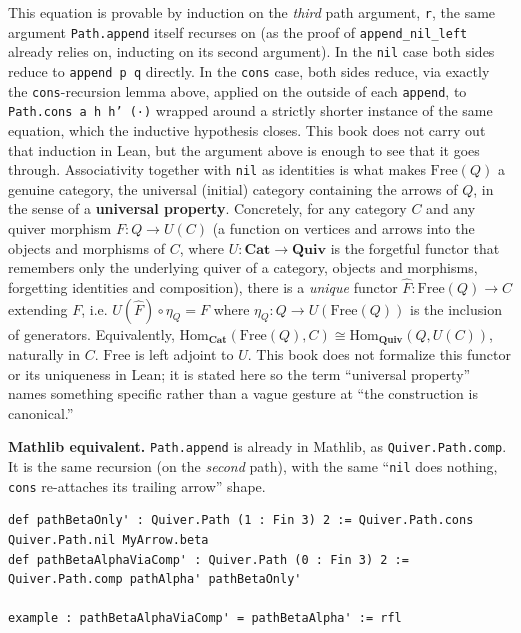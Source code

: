 This equation is provable by induction on the \emph{third} path argument, \texttt{r}, the same argument \texttt{Path.append} itself recurses on (as the proof of \texttt{append\_\allowbreak{}nil\_\allowbreak{}left} already relies on, inducting on its second argument). In the \texttt{nil} case both sides reduce to \texttt{append p q} directly. In the \texttt{cons} case, both sides reduce, via exactly the \texttt{cons}-recursion lemma above, applied on the outside of each \texttt{append}, to \texttt{Path.cons a h h' (·)} wrapped around a strictly shorter instance of the same equation, which the inductive hypothesis closes. This book does not carry out that induction in Lean, but the argument above is enough to see that it goes through. Associativity together with \texttt{nil} as identities is what makes \(\mathrm{Free}(Q)\) a genuine category, the universal (initial) category containing the arrows of \(Q\), in the sense of a \textbf{universal property}. Concretely, for any category \(C\) and any quiver morphism \(F : Q \to U(C)\) (a function on vertices and arrows into the objects and morphisms of \(C\), where \(U : \mathbf{Cat} \to \mathbf{Quiv}\) is the forgetful functor that remembers only the underlying quiver of a category, objects and morphisms, forgetting identities and composition), there is a \emph{unique} functor \(\hat F : \mathrm{Free}(Q) \to C\) extending \(F\), i.e. \(U(\hat F) \circ \eta_Q = F\) where \(\eta_Q : Q \to U(\mathrm{Free}(Q))\) is the inclusion of generators. Equivalently, \(\mathrm{Hom}_{\mathbf{Cat}}(\mathrm{Free}(Q), C) \cong \mathrm{Hom}_{\mathbf{Quiv}}(Q, U(C))\), naturally in \(C\). \(\mathrm{Free}\) is left adjoint to \(U\). This book does not formalize this functor or its uniqueness in Lean; it is stated here so the term ``universal property'' names something specific rather than a vague gesture at ``the construction is canonical.''

\textbf{Mathlib equivalent.} \texttt{Path.append} is already in Mathlib, as \texttt{Quiver.Path.comp}. It is the same recursion (on the \emph{second} path), with the same ``\texttt{nil} does nothing, \texttt{cons} re-attaches its trailing arrow'' shape.

\begin{lstlisting}
def pathBetaOnly' : Quiver.Path (1 : Fin 3) 2 := Quiver.Path.cons Quiver.Path.nil MyArrow.beta
def pathBetaAlphaViaComp' : Quiver.Path (0 : Fin 3) 2 := Quiver.Path.comp pathAlpha' pathBetaOnly'

example : pathBetaAlphaViaComp' = pathBetaAlpha' := rfl
\end{lstlisting}


